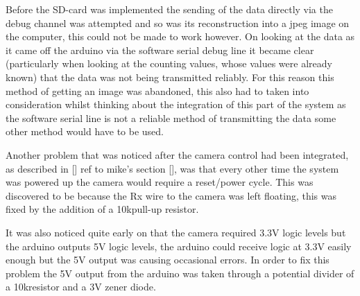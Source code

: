 Before the SD-card was implemented the sending of the data directly via the debug channel was attempted and so was its reconstruction into a jpeg image on the computer, this could not be made to work however. On looking at the data as it came off the arduino via the software serial debug line it became clear (particularly when looking at the counting values, whose values were already known) that the data was not being transmitted reliably. For this reason this method of getting an image was abandoned, this also had to taken into consideration whilst thinking about the integration of this part of the system as the software serial line is not a reliable method of transmitting the data some other method would have to be used.

Another problem that was noticed after the camera control had been integrated, as described in [] ref to mike's section [], was that every other time the system was powered up the camera would require a reset/power cycle. This was discovered to be because the Rx wire to the camera was left floating, this was fixed by the addition of a 10k\Omega pull-up resistor.

It was also noticed quite early on that the camera required 3.3V logic levels but the arduino outputs 5V logic levels, the arduino could receive logic at 3.3V easily enough but the 5V output was causing occasional errors. In order to fix this problem the 5V output from the arduino was taken through a potential divider of a 10k\Omega resistor and a 3V zener diode.